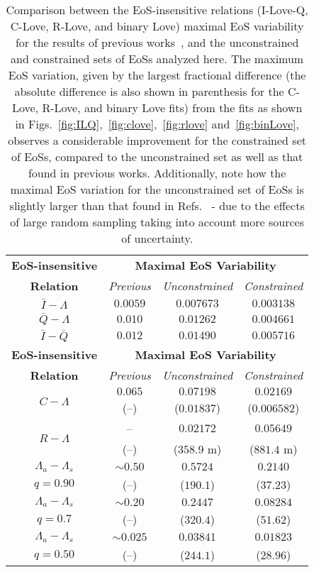 \documentclass[prd,twocolumn,nofootinbib,superscriptaddress,amsmath,amssymb]{revtex4-1}
\begin{document}
\begin{table}
\centering
\caption{
Comparison between the EoS-insensitive relations (I-Love-Q, C-Love, R-Love, and binary Love) maximal EoS variability for the results of previous works~\cite{Yagi:ILQ,Yagi:binLove}, and the unconstrained and constrained sets of EoSs analyzed here. 
The maximum EoS variation, given by the largest fractional difference (the absolute difference is also shown in parenthesis for the C-Love, R-Love, and binary Love fits) from the fits as shown in Figs.~\ref{fig:ILQ},~\ref{fig:clove},~\ref{fig:rlove} and~\ref{fig:binLove}, observes a considerable improvement for the constrained set of EoSs, compared to the unconstrained set as well as that found in previous works.
Additionally, note how the maximal EoS variation for the unconstrained set of EoSs is slightly larger than that found in Refs.~\cite{Yagi:ILQ,Yagi:binLove} - due to the effects of large random sampling taking into account more sources of uncertainty.
}\label{tab:maxVar}
\begin{tabular}{ c  || c c c } 
 \hline
 \hline
 \textbf{EoS-insensitive} & \multicolumn{3}{c}{\textbf{Maximal EoS Variability}} \\
 \cline{2-4}
 \textbf{Relation} & \multicolumn{1}{c|}{\emph{Previous}} & \multicolumn{1}{c|}{\emph{Unconstrained}} & \emph{Constrained}\\
 \hline
 $\bar{I}-\Lambda$ &  $0.0059$ & $0.007673$ & $0.003138$\\
 $\bar{Q}-\Lambda$ & $0.010$ & $0.01262$ & $0.004661$\\
 $\bar{I}-\bar{Q}$ & $0.012$ & $0.01490$ & $0.005716$\\
 \hline
 \noalign{\smallskip}
\noalign{\smallskip}
 \noalign{\smallskip}
\noalign{\smallskip}
\hline
 \hline
 \textbf{EoS-insensitive} & \multicolumn{3}{c}{\textbf{Maximal EoS Variability}} \\
 \cline{2-4}
 \textbf{Relation} & \multicolumn{1}{c|}{\emph{Previous}} & \multicolumn{1}{c|}{\emph{Unconstrained}} & \emph{Constrained}\\
 \hline
 \multirow{2}{*}{$C-\Lambda$} & $0.065$ & $0.07198$ & $0.02169$\\
 & (--) & ($0.01837$) & ($0.006582$)\\
  \hline
 \multirow{2}{*}{$R-\Lambda$} & -- & $0.02172$ & $0.05649$\\
 & (--) & ($358.9 \text{ m}$) & ($881.4 \text{ m}$)\\
 \hline
 $\Lambda_a-\Lambda_s$ & $\sim0.50$ & $0.5724$ & $0.2140$\\
 $q=0.90$ & (--) & ($190.1$) & ($37.23$) \\
 \cline{1-1}
 $\Lambda_a-\Lambda_s$ & $\sim0.20$ & $0.2447$ & $0.08284$\\
  $q=0.7$ & (--) & ($320.4$) & ($51.62$) \\
  \cline{1-1}
 $\Lambda_a-\Lambda_s$ & $\sim0.025$ & $0.03841$ & $0.01823$\\
  $q=0.50$ & (--) & ($244.1$) & ($28.96$) \\
  \cline{1-1}
\hline
\hline
\end{tabular}
\end{table}
\end{document}
